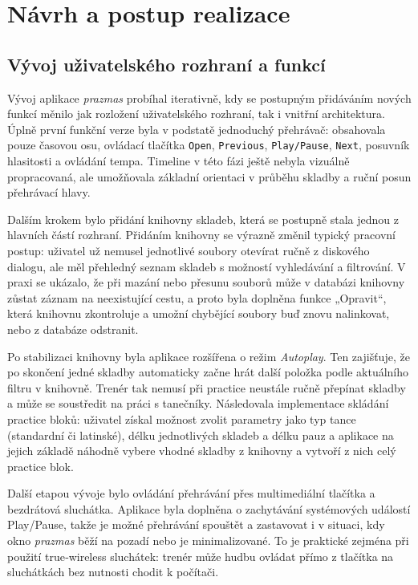 \documentclass[12pt, a4paper,
]{report}
\begin{document}
\chapter{Návrh a postup realizace}

\section{Vývoj uživatelského rozhraní a funkcí}

Vývoj aplikace \textit{prazmas} probíhal iterativně, kdy se postupným přidáváním nových funkcí měnilo jak rozložení uživatelského rozhraní, tak i vnitřní architektura. Úplně první funkční verze byla v podstatě jednoduchý přehrávač: obsahovala pouze časovou osu, ovládací tlačítka \texttt{Open}, \texttt{Previous}, \texttt{Play/Pause}, \texttt{Next}, posuvník hlasitosti a ovládání tempa. Timeline v této fázi ještě nebyla vizuálně propracovaná, ale umožňovala základní orientaci v průběhu skladby a ruční posun přehrávací hlavy.

Dalším krokem bylo přidání knihovny skladeb, která se postupně stala jednou z hlavních částí rozhraní. Přidáním knihovny se výrazně změnil typický pracovní postup: uživatel už nemusel jednotlivé soubory otevírat ručně z diskového dialogu, ale měl přehledný seznam skladeb s možností vyhledávání a filtrování. V praxi se ukázalo, že při mazání nebo přesunu souborů může v databázi knihovny zůstat záznam na neexistující cestu, a proto byla doplněna funkce „Opravit“, která knihovnu zkontroluje a umožní chybějící soubory buď znovu nalinkovat, nebo z databáze odstranit.

Po stabilizaci knihovny byla aplikace rozšířena o režim \emph{Autoplay}. Ten zajišťuje, že po skončení jedné skladby automaticky začne hrát další položka podle aktuálního filtru v knihovně. Trenér tak nemusí při practice neustále ručně přepínat skladby a může se soustředit na práci s tanečníky. Následovala implementace skládání practice bloků: uživatel získal možnost zvolit parametry jako typ tance (standardní či latinské), délku jednotlivých skladeb a délku pauz a aplikace na jejich základě náhodně vybere vhodné skladby z knihovny a vytvoří z nich celý practice blok.

Další etapou vývoje bylo ovládání přehrávání přes multimediální tlačítka a bezdrátová sluchátka. Aplikace byla doplněna o zachytávání systémových událostí Play/Pause, takže je možné přehrávání spouštět a zastavovat i v situaci, kdy okno \textit{prazmas} běží na pozadí nebo je minimalizované. To je praktické zejména při použití true‑wireless sluchátek: trenér může hudbu ovládat přímo z tlačítka na sluchátkách bez nutnosti chodit k počítači.
\end{document}
